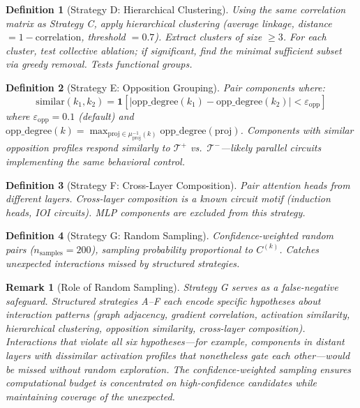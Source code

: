 \documentclass[11pt]{article}
\newtheorem{definition}{Definition}[section]
\newtheorem{remark}{Remark}[section]
\begin{document}
\begin{definition}[Strategy D: Hierarchical Clustering]
Using the same correlation matrix as Strategy C, apply hierarchical clustering (average linkage, distance $= 1 - \text{correlation}$, threshold $= 0.7$). Extract clusters of size $\geq 3$. For each cluster, test collective ablation; if significant, find the minimal sufficient subset via greedy removal. Tests functional groups.
\end{definition}

\begin{definition}[Strategy E: Opposition Grouping]
Pair components where:
\begin{equation}
\text{similar}(k_1, k_2) = \mathbf{1}\!\left[|\text{opp\_degree}(k_1) - \text{opp\_degree}(k_2)| < \varepsilon_{\text{opp}}\right]
\end{equation}
where $\varepsilon_{\text{opp}} = 0.1$ (default) and $\text{opp\_degree}(k) = \max_{\text{proj} \in \mu_{\text{proj}}^{-1}(k)} \text{opp\_degree}(\text{proj})$. Components with similar opposition profiles respond similarly to $\mathcal{T}^+$ vs.\ $\mathcal{T}^-$---likely parallel circuits implementing the same behavioral control.
\end{definition}

\begin{definition}[Strategy F: Cross-Layer Composition]
Pair attention heads from different layers. Cross-layer composition is a known circuit motif (induction heads, IOI circuits). MLP components are excluded from this strategy.
\end{definition}

\begin{definition}[Strategy G: Random Sampling]
Confidence-weighted random pairs ($n_{\text{samples}} = 200$), sampling probability proportional to $C^{(k)}$. Catches unexpected interactions missed by structured strategies.
\end{definition}

\begin{remark}[Role of Random Sampling]
Strategy G serves as a false-negative safeguard. Structured strategies A--F each encode specific hypotheses about interaction patterns (graph adjacency, gradient correlation, activation similarity, hierarchical clustering, opposition similarity, cross-layer composition). Interactions that violate all six hypotheses---for example, components in distant layers with dissimilar activation profiles that nonetheless gate each other---would be missed without random exploration. The confidence-weighted sampling ensures computational budget is concentrated on high-confidence candidates while maintaining coverage of the unexpected.
\end{remark}
\end{document}
